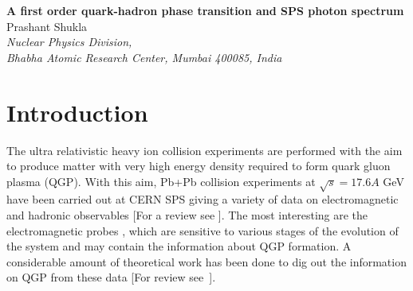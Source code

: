 
\newcommand{\fm}{\mbox{fm}}
\newcommand{\MeV}{\mbox{MeV}}
\newcommand{\GeV}{\mbox{GeV}}



\begin{center}
{\large \bf A first order quark-hadron phase transition
            and SPS photon spectrum}\\
{Prashant Shukla}\\
{\it Nuclear Physics Division,\\
 Bhabha Atomic Research Center, Mumbai 400085, India}
\end{center}

\begin{abstract}

In this work, the photon spectrum measured in Pb+Pb collision 
experiments at $\sqrt s = 17.6A$ GeV at SPS, CERN has been analyzed
in a hydrodynamical model. The data is compared with the calculation
obtained using different scenarios of first order phase transition, namely
idealized Maxwell construction, supercooling, sudden hadronization
and fragmentation.
  
  
\noindent
{\it Keywords}: Quark-Gluon Plasma,
Relativistic Heavy-Ion Collisions, Photon Production, 
Dilepton Production

\medskip

\noindent
{\it PACS numbers}: 12.38.Mh, 25.75.-q, 05.70.Fh

\end{abstract}

\section{Introduction} \label{Introduction}

  The ultra relativistic heavy ion collision experiments are performed 
with the aim to produce matter with very high energy density required to 
form quark gluon plasma (QGP). With this aim, Pb+Pb collision experiments 
at $\sqrt s = 17.6A$ GeV have been carried out at CERN SPS giving a 
variety of data on electromagnetic and hadronic observables
[For a review see \cite{ESKOLA}]. 
  The most interesting are the electromagnetic probes \cite{WA98}, 
which are sensitive to various stages of the evolution of the system and 
may contain the information about QGP formation. 
  A considerable amount of theoretical work has been done 
to dig out the information on QGP from these 
data [For review see~\cite{GALER,PEITZ}].

